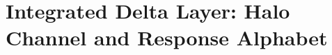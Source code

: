 
\clearpage
\section*{Integrated Delta Layer: Halo Channel and Response Alphabet}
\providecommand{\HC}{}
\renewcommand{\HC}{\mathrm{HC}}
\providecommand{\MM}{}
\renewcommand{\MM}{\mathrm{MM}}
\providecommand{\OP}{}
\renewcommand{\OP}{\mathrm{OP}}
\providecommand{\adm}{}
\renewcommand{\adm}{\mathrm{adm}}
\providecommand{\tun}{}
\renewcommand{\tun}{\mathrm{tun}}
\providecommand{\cand}{}
\renewcommand{\cand}{\mathrm{cand}}
\providecommand{\unr}{}
\renewcommand{\unr}{\mathrm{unr}}
\providecommand{\rout}{}
\renewcommand{\rout}{\mathrm{rout}}
\providecommand{\Cone}{}
\renewcommand{\Cone}{\mathrm{cone}}
\providecommand{\rad}{}
\renewcommand{\rad}{\mathrm{rad}}
\providecommand{\proj}{}
\renewcommand{\proj}{\mathrm{proj}}
\providecommand{\coll}{}
\renewcommand{\coll}{\mathrm{coll}}
\providecommand{\rk}{}
\renewcommand{\rk}{\mathrm{rk}}
\providecommand{\ov}{}
\renewcommand{\ov}{\mathrm{ov}}
\providecommand{\Exit}{}
\renewcommand{\Exit}{\mathsf{Exit}}
\providecommand{\Halo}{}
\renewcommand{\Halo}{\mathsf{Halo}}
\providecommand{\Trap}{}
\renewcommand{\Trap}{\mathsf{Trap}}
\providecommand{\Gate}{}
\renewcommand{\Gate}{\mathsf{Gate}}
\providecommand{\Atlas}{}
\renewcommand{\Atlas}{\mathfrak A}
\providecommand{\epsr}{}
\renewcommand{\epsr}{\varepsilon_r}
\providecommand{\epsh}{}
\renewcommand{\epsh}{\varepsilon_h}
\providecommand{\Xop}{}
\renewcommand{\Xop}{\mathcal X_{\OP5}^{\adm}}
\providecommand{\Ttun}{}
\renewcommand{\Ttun}{\mathcal T_{\tun}}
\providecommand{\Dhc}{}
\renewcommand{\Dhc}{D_{\HC\text{-}\mathrm{cone}}}
\providecommand{\ConeObs}{}
\renewcommand{\ConeObs}{D_{\OP5=\HC\text{-}\mathrm{cone}}}
\providecommand{\RHC}{}
\renewcommand{\RHC}{R_{\HC}}
\providecommand{\Upi}{}
\renewcommand{\Upi}{U_{\pi}^{(2)}}
\providecommand{\Pcr}{}
\renewcommand{\Pcr}{\Pi_{\Cone\to\rad}^{\HC,\gamma}}
\providecommand{\rhoR}{}
\renewcommand{\rhoR}{\rho_{r}^{\gamma}}
\providecommand{\rhoH}{}
\renewcommand{\rhoH}{\rho_{h}^{\gamma}}
\providecommand{\Eexit}{}
\renewcommand{\Eexit}{\mathcal E_{\Exit}^{\gamma,K}}
\providecommand{\Jexit}{}
\renewcommand{\Jexit}{J_{\Exit}^{\gamma,K}}
\providecommand{\Th}{}
\renewcommand{\Th}{\Theta_{\gamma,K}^{(2)}}
\providecommand{\rHC}{}
\renewcommand{\rHC}{r_{\HC}^{(1)}}



